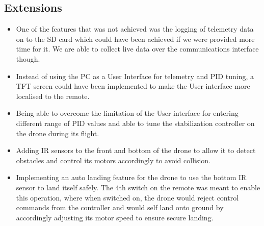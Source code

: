 \documentclass[a4paper,11pt]{article}
\begin{document}
\subsection{Extensions}
\begin{itemize}
    \item One of the features that was not achieved was the logging of telemetry data on to the SD card which could have been achieved if we were provided more time for it. We are able to collect live data over the communications interface though. 
    \item Instead of using the PC as a User Interface for telemetry and PID tuning, a TFT screen could have been implemented to make the User interface more localised to the remote.
    \item Being able to overcome the limitation of the User interface for entering different range of PID values and able to tune the stabilization controller on the drone during its flight.
    \item Adding IR sensors to the front and bottom of the drone to allow it to detect obstacles and control its motors accordingly to avoid collision.
    \item Implementing an auto landing feature for the drone to use the bottom IR sensor to land itself safely. The 4th switch on the remote was meant to enable this operation, where when switched on, the drone would reject control commands from the controller and would self land onto ground by accordingly adjusting its motor speed to ensure secure landing.
\end{itemize}




\appendix
\newpage
\end{document}
